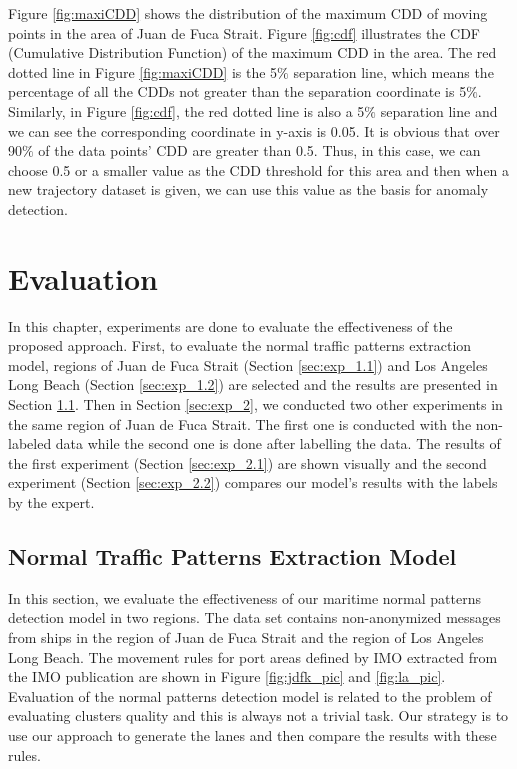 \documentclass[12pt,glossary]{dalcsthesis}
\begin{document}
Figure \ref{fig:maxiCDD} shows the distribution of the maximum CDD of moving points in the area of Juan de Fuca Strait. Figure \ref{fig:cdf} illustrates the CDF (Cumulative Distribution Function) of the maximum CDD in the area. The red dotted line in Figure \ref{fig:maxiCDD} is the 5$\%$ separation line, which means the percentage of all the CDDs not greater than the separation coordinate is 5$\%$. Similarly, in Figure \ref{fig:cdf}, the red dotted line is also a 5$\%$ separation line and we can see the corresponding coordinate in y-axis is 0.05. It is obvious that over 90$\%$ of the data points' CDD are greater than 0.5. Thus, in this case, we can choose 0.5 or a smaller value as the CDD threshold for this area and then when a new trajectory dataset is given, we can use this value as the basis for anomaly detection.







\chapter{Evaluation}
\label{ch:evaluation}
In this chapter, experiments are done to evaluate the effectiveness of the proposed approach. First, to evaluate the normal traffic patterns extraction model, regions of Juan de Fuca Strait (Section \ref{sec:exp_1.1}) and Los Angeles Long Beach (Section \ref{sec:exp_1.2}) are selected and the results are presented in Section \ref{sec:exp_1}. Then in Section \ref{sec:exp_2}, we conducted two other experiments in the same region of Juan de Fuca Strait. The first one is conducted with the non-labeled data while the second one is done after labelling the data. The results of the first experiment (Section \ref{sec:exp_2.1}) are  shown  visually  and  the  second  experiment (Section \ref{sec:exp_2.2}) compares our model’s results with the labels by the expert.

\section{Normal Traffic Patterns Extraction Model}
\label{sec:exp_1}
In this section, we evaluate the effectiveness of our maritime normal patterns detection model in two regions. The data set contains non-anonymized messages from ships in the region of Juan de Fuca Strait and the region of Los Angeles Long Beach. The movement rules for port areas defined by IMO extracted from the IMO publication \cite{anabook} are shown in Figure \ref{fig:jdfk_pic} and \ref{fig:la_pic}. Evaluation of the normal patterns detection model is related to the problem of evaluating clusters quality and this is always not a trivial task. Our strategy is to use our approach to generate the lanes and then compare the results with these rules.
\end{document}

